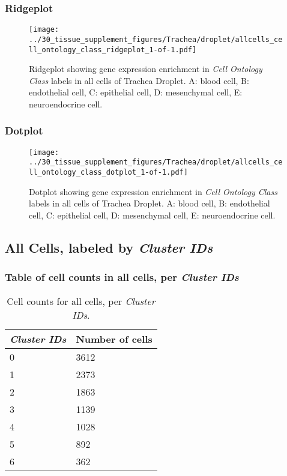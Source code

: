 \subsubsection{Ridgeplot}
\begin{figure}[h]
\centering
\texttt{[image: ../30\_tissue\_supplement\_figures/Trachea/droplet/allcells\_cell\_ontology\_class\_ridgeplot\_1-of-1.pdf]}

\caption{ Ridgeplot  showing gene expression enrichment in \emph{Cell Ontology Class} labels in all cells of Trachea Droplet. A: blood cell, B: endothelial cell, C: epithelial cell, D: mesenchymal cell, E: neuroendocrine cell.}
\end{figure}


\clearpage

\subsubsection{Dotplot}
\begin{figure}[h]
\centering
\texttt{[image: ../30\_tissue\_supplement\_figures/Trachea/droplet/allcells\_cell\_ontology\_class\_dotplot\_1-of-1.pdf]}

\caption{ Dotplot  showing gene expression enrichment in \emph{Cell Ontology Class} labels in all cells of Trachea Droplet. A: blood cell, B: endothelial cell, C: epithelial cell, D: mesenchymal cell, E: neuroendocrine cell.}
\end{figure}


\clearpage

\subsection{All Cells, labeled by \emph{Cluster IDs}}
\subsubsection{Table of cell counts in all cells, per \emph{Cluster IDs}}\begin{table}[h]
\centering
\label{my-label}
\begin{tabular}{@{}ll@{}}
\toprule

\emph{Cluster IDs}& Number of cells \\ \midrule
0 & 3612 \\

1 & 2373 \\

2 & 1863 \\

3 & 1139 \\

4 & 1028 \\

5 & 892 \\

6 & 362 \\
\bottomrule
\end{tabular}
\caption{Cell counts for all cells, per \emph{Cluster IDs}.}
\end{table}

